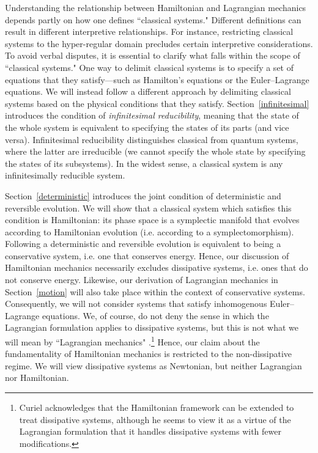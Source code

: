 \documentclass[letterpaper]{article}
\begin{document}
Understanding the relationship between Hamiltonian and Lagrangian mechanics depends partly on how one defines ``classical systems." Different definitions can result in different interpretive relationships. For instance, restricting classical systems to the hyper-regular domain precludes certain interpretive considerations. To avoid verbal disputes, it is essential to clarify what falls within the scope of ``classical systems." One way to delimit classical systems is to specify a set of equations that they satisfy---such as Hamilton's equations or the Euler--Lagrange equations. We will instead follow a different approach by delimiting classical systems based on the physical conditions that they satisfy. Section~\ref{infinitesimal} introduces the condition of \textit{infinitesimal reducibility}, meaning that the state of the whole system is equivalent to specifying the states of its parts (and vice versa). Infinitesimal reducibility distinguishes classical from quantum systems, where the latter are irreducible (we cannot specify the whole state by specifying the states of its subsystems). In the widest sense, a classical system is any infinitesimally reducible system.

Section~\ref{deterministic} introduces the joint condition of deterministic and reversible evolution. We will show that a classical system which satisfies this condition is Hamiltonian: its phase space is a symplectic manifold that evolves according to Hamiltonian evolution  (i.e. according to a symplectomorphism). Following a deterministic and reversible evolution is equivalent to being a conservative system, i.e. one that conserves energy. Hence, our discussion of Hamiltonian mechanics necessarily excludes dissipative systems, i.e. ones that do not conserve energy. Likewise, our derivation of Lagrangian mechanics in Section~\ref{motion} will also take place within the context of conservative systems. Consequently, we will not consider systems that satisfy inhomogenous Euler--Lagrange equations. We, of course, do not deny the sense in which the Lagrangian formulation applies to dissipative systems, but this is not what we will mean by ``Lagrangian mechanics" \parencites[]{Smith}{Curiel}.\footnote{Curiel \parencites*[311]{Curiel} acknowledges that the Hamiltonian framework can be extended to treat dissipative systems, although he seems to view it as a virtue of the Lagrangian formulation that it handles dissipative systems with fewer modifications.} Hence, our claim about the fundamentality of Hamiltonian mechanics is restricted to the non-dissipative regime. We will view dissipative systems as Newtonian, but neither Lagrangian nor Hamiltonian.
\end{document}
